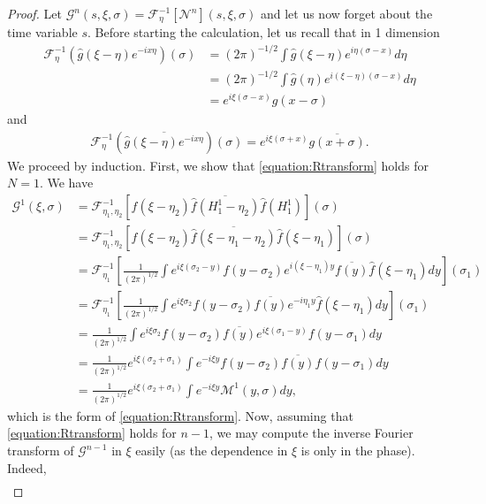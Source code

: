 \documentclass[a4paper, 15pt]{article}
\numberwithin{equation}{section}
\begin{document}
\begin{proof}
Let $\mathcal{G}^n(s,\xi,\sigma)=\mathcal{F}^{-1}_{\eta}[\mathcal{N}^n](s,\xi,\sigma)$ and let us now forget about the time variable $s$.
 Before starting the calculation, let us recall that in 1 dimension
\begin{align*}
    \mathcal{F}^{-1}_{\eta}(\hat{g}(\xi-\eta)e^{-i x\eta})(\sigma)&=(2\pi)^{-1/2}\int \hat{g}(\xi-\eta)e^{i\eta(\sigma- x)}d\eta\\
    &=(2\pi)^{-1/2}\int \hat{g}(\eta)e^{i(\xi-\eta)(\sigma- x)}d\eta\\
    &=e^{i\xi(\sigma- x)}g(x-\sigma)
\end{align*}
and 
\begin{align*}
    \mathcal{F}^{-1}_{\eta}(\overline{\hat{g}(\xi-\eta)e^{-i x\eta}})(\sigma)=e^{i\xi(\sigma+ x)}\overline{g(x+\sigma)}.
\end{align*}
We proceed by induction. First, we show that \eqref{equation:Rtransform} holds for $N=1$. We have 
\begin{align*}
    \mathcal{G}^1(\xi,\sigma)&=\mathcal{F}^{-1}_{\eta_1,\eta_2}[\hat{f}(\xi-\eta_{2})\overline{\hat{f}( H^1_{1}-\eta_{2})}\hat{f}(H^1_1)](\sigma)\\
    &=\mathcal{F}^{-1}_{\eta_1,\eta_2}[\hat{f}(\xi-\eta_{2})\overline{\hat{f}( \xi-\eta_1-\eta_{2})}\hat{f}(\xi-\eta_1)](\sigma)\\
    &=\mathcal{F}^{-1}_{\eta_1}[\frac{1}{(2\pi)^{1/2}}\int e^{i\xi(\sigma_2-y)}f(y-\sigma_{2})e^{i(\xi-\eta_1)y}\overline{f( y)}\hat{f}(\xi-\eta_1)dy](\sigma_1)\\
    &=\mathcal{F}^{-1}_{\eta_1}[\frac{1}{(2\pi)^{1/2}}\int e^{i\xi\sigma_2}f(y-\sigma_{2})\overline{f( y)}e^{-i\eta_1y}\hat{f}(\xi-\eta_1)dy](\sigma_1)\\
    &=\frac{1}{(2\pi)^{1/2}}\int e^{i\xi\sigma_2}f(y-\sigma_{2})\overline{f( y)}e^{i\xi(\sigma_1-y)}f(y-\sigma_1)dy\\
    &=\frac{1}{(2\pi)^{1/2}}e^{i\xi(\sigma_2+\sigma_1)}\int e^{-i\xi y}f(y-\sigma_{2})\overline{f( y)}f(y-\sigma_1)dy\\
    &=\frac{1}{(2\pi)^{1/2}}e^{i\xi(\sigma_2+\sigma_1)}\int e^{-i\xi y}\mathcal{M}^1(y,\sigma)dy,
\end{align*}
which is the form of \eqref{equation:Rtransform}.  
Now, assuming that \eqref{equation:Rtransform} holds for $n-1$, we may compute the inverse Fourier transform of $\mathcal{G}^{n-1}$ in $\xi$ easily (as the dependence in $\xi$ is only in the phase). Indeed,
\begin{align*}

\end{align*}
\end{proof}
\end{document}
